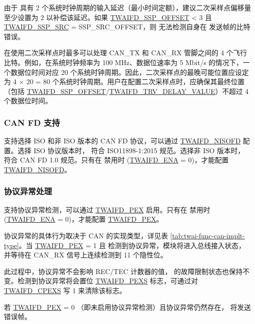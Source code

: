 \documentclass[main\_\_CN.tex]{subfiles}
\begin{document}
由于 \modulename{} 具有 2 个系统时钟周期的输入延迟（最小时间定额），建议二次采样点偏移量至少设置为 2 以补偿该延迟。如果 \hyperref[fielddesc:TWAIFDSSPOFFSET]{TWAIFD\_SSP\_OFFSET} < 3 且 \hyperref[fielddesc:TWAIFDSSPSRC]{TWAIFD\_SSP\_SRC} = SSP\_SRC\_OFFSET，则 \modulename{} 无法检测自身在 \modulename{} 发送帧的比特错误。

\modulename{} 在使用二次采样点时最多可以处理 CAN\_TX 和 CAN\_RX 管脚之间的 4 个飞行比特。例如，在系统时钟频率为 100 MHz、数据位速率为 5 Mbit/s 的情况下，一个数据位时间对应 20 个系统时钟周期。因此，二次采样点的最晚可能位置应设定为 4 × 20 = 80 个系统时钟周期。用户在配置二次采样点时，应确保其最终位置（包括 \hyperref[fielddesc:TWAIFDSSPOFFSET]{TWAIFD\_SSP\_OFFSET}/\hyperref[fielddesc:TWAIFDTRVDELAYVALUE]{TWAIFD\_TRV\_DELAY\_VALUE}）不超过 4 个数据位时间。


\subsubsection{CAN FD 支持}

\modulename{} 支持选择 ISO 和非 ISO 版本的 CAN FD 协议，可以通过 \hyperref[fielddesc:TWAIFDNISOFD]{TWAIFD\_NISOFD} 配置。选择 ISO 协议版本时，\modulename{} 符合 ISO11898-1:2015 规范。选择非 ISO 版本时，\modulename{} 符合 CAN FD 1.0 规范。只有在 \modulename{} 禁用时 (\hyperref[fielddesc:TWAIFDENA]{TWAIFD\_ENA} = 0)，才能配置 \hyperref[fielddesc:TWAIFDNISOFD]{TWAIFD\_NISOFD}。

\subsubsection{协议异常处理}

\modulename{} 支持协议异常检测，可以通过 \hyperref[fielddesc:TWAIFDPEX]{TWAIFD\_PEX} 启用。只有在 \modulename{} 禁用时 (\hyperref[fielddesc:TWAIFDENA]{TWAIFD\_ENA} = 0)，才能配置 \hyperref[fielddesc:TWAIFDPEX]{TWAIFD\_PEX}。

协议异常的具体行为取决于 CAN 的实现类型，详见表 \ref{tab:twai-func-can-implt-type}。当 \hyperref[fielddesc:TWAIFDPEX]{TWAIFD\_PEX} = 1 且 \modulename{} 检测到协议异常，模块将进入总线接入状态，并等待在 CAN\_RX 信号上连续检测到 11 个隐性位。

此过程中，协议异常不会影响 REC/TEC 计数器的值，\modulename{} 的故障限制状态也保持不变。检测到协议异常将会置位 \hyperref[fielddesc:TWAIFDPEXS]{TWAIFD\_PEXS} 标志，可通过对 \hyperref[fielddesc:TWAIFDCPEXS]{TWAIFD\_CPEXS} 写 1 来清除该标志。

若 \hyperref[fielddesc:TWAIFDPEX]{TWAIFD\_PEX} = 0 （即未启用协议异常检测）且协议异常仍然存在，\modulename{} 将发送错误帧。
\end{document}
